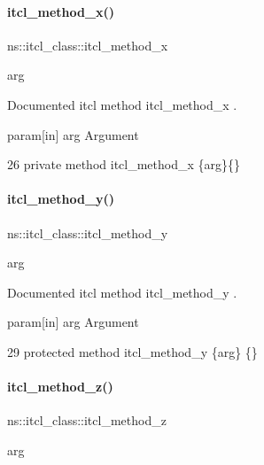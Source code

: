 \paragraph{\texorpdfstring{itcl\+\_\+method\+\_\+x()}{itcl\_method\_x()}}
{\footnotesize\ttfamily ns\+::itcl\+\_\+class\+::itcl\+\_\+method\+\_\+x\begin{DoxyParamCaption}\item[{}]{arg  }\end{DoxyParamCaption}}



Documented itcl method {\ttfamily itcl\+\_\+method\+\_\+x} . 

param\mbox{[}in\mbox{]} arg Argument 
\begin{DoxyCode}
26     \textcolor{keyword}{private} \textcolor{keyword}{method} itcl\_method\_x \{arg\}\{\}
\end{DoxyCode}
\mbox{\label{classns_1_1itcl__class_a092d0f8ed4796902e41fbeb1dfed82f1}} 
\paragraph{\texorpdfstring{itcl\+\_\+method\+\_\+y()}{itcl\_method\_y()}}
{\footnotesize\ttfamily ns\+::itcl\+\_\+class\+::itcl\+\_\+method\+\_\+y\begin{DoxyParamCaption}\item[{}]{arg  }\end{DoxyParamCaption}}



Documented itcl method {\ttfamily itcl\+\_\+method\+\_\+y} . 

param\mbox{[}in\mbox{]} arg Argument 
\begin{DoxyCode}
29     \textcolor{keyword}{protected} \textcolor{keyword}{method} itcl\_method\_y \{arg\} \{\}
\end{DoxyCode}
\mbox{\label{classns_1_1itcl__class_a13a383c766e489814960345540106cc1}} 
\paragraph{\texorpdfstring{itcl\+\_\+method\+\_\+z()}{itcl\_method\_z()}}
{\footnotesize\ttfamily ns\+::itcl\+\_\+class\+::itcl\+\_\+method\+\_\+z\begin{DoxyParamCaption}\item[{}]{arg  }\end{DoxyParamCaption}}



